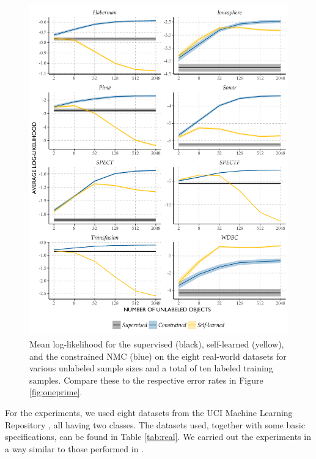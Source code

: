 \documentclass[twoside]{memoir}\usepackage[]{graphicx}\usepackage{xcolor}
\makeatletter
\def\maxwidth{ %
  \ifdim\Gin@nat@width>\linewidth
    \linewidth
  \else
    \Gin@nat@width
  \fi
}
\newenvironment{knitrout}{}{} %
\renewcommand{\cite}{\citep}
\makeatother
\begin{document}
\begin{knitrout}
\color{fgcolor}\begin{figure}
\includegraphics[width=\maxwidth]{figure/twoprime-1} \caption{Mean log-likelihood for the supervised (black), self-learned (yellow), and the constrained NMC (blue) on the eight real-world datasets for various unlabeled sample sizes and a total of ten labeled training samples.   Compare these to the respective error rates in Figure \ref{fig:oneprime}.}\label{fig:twoprime}
\end{figure}


\end{knitrout}

For the experiments, we used eight datasets from the UCI Machine Learning Repository \cite{Lichman2013}, all having two classes. The datasets used, together with some basic specifications, can be found in Table \ref{tab:real}.  We carried out the experiments in a way similar to those performed in \cite{Loog2014a}.
\end{document}
